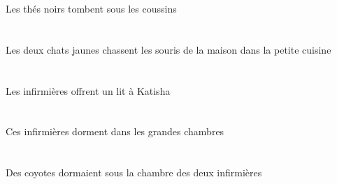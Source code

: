 \begin{exe}
Les thés noirs tombent sous les coussins
\ex\glll
\DEFDuErg{}   \jauneDDu{}   \chatDDuErg{}    \DEFSgObl{}   \petitDSg{}   \cuisineDSgObl{}   \DANS{}   \DEFPlAbs{}    \DEFSgObl{}   \maisonDSgObl{}   \DE{}   \sourisBPlAbs{}  \chasserVtPrsBPl{}\\
\DEFDuErgP{}   \jauneDDuP{}   \chatDDuErgP{}    \DEFSgOblP{}   \petitDSgP{}   \cuisineDSgOblP{}   \DANSP{}   \DEFPlAbsP{}    \DEFSgOblP{}   \maisonDSgOblP{}   \DEP{}   \sourisBPlAbsP{}  \chasserVtPrsBPlP{}\\
\DEFDuErgG{}   \jauneDDuG{}   \chatDDuErgG{}    \DEFSgOblG{}   \petitDSgG{}   \cuisineDSgOblG{}   \DANSG{}   \DEFPlAbsG{}    \DEFSgOblG{}   \maisonDSgOblG{}   \DEG{}   \sourisBPlAbsG{}  \chasserVtPrsBPlG{}\\
Les deux chats jaunes chassent les souris de la maison dans la petite cuisine
\ex\glll
\DEFPlErg{}   \infirmiereAPlErg{}    \INDSgDat{}   \KatishaASgDat{}   \INDSgAbs{}   \litDSgAbs{}  \offrirVdPrsDSg{}\\
\DEFPlErgP{}   \infirmiereAPlErgP{}    \INDSgDatP{}   \KatishaASgDatP{}   \INDSgAbsP{}   \litDSgAbsP{}  \offrirVdPrsDSgP{}\\
\DEFPlErgG{}   \infirmiereAPlErgG{}    \INDSgDatG{}   \KatishaASgDatG{}   \INDSgAbsG{}   \litDSgAbsG{}  \offrirVdPrsDSgG{}\\
Les infirmières offrent un lit à Katisha
\ex\glll
\DEMPlAbs{}   \infirmiereAPlAbs{}    \DEFPlObl{}   \grandBPl{}   \chambreBPlObl{}   \DANS{}  \dormirViPrsAPl{}\\
\DEMPlAbsP{}   \infirmiereAPlAbsP{}    \DEFPlOblP{}   \grandBPlP{}   \chambreBPlOblP{}   \DANSP{}  \dormirViPrsAPlP{}\\
\DEMPlAbsG{}   \infirmiereAPlAbsG{}    \DEFPlOblG{}   \grandBPlG{}   \chambreBPlOblG{}   \DANSG{}  \dormirViPrsAPlG{}\\
Ces infirmières dorment dans les grandes chambres
\ex\glll
\DEFSgObl{}    \DEFDuObl{}   \infirmiereADuObl{}   \DE{}   \chambreBSgObl{}   \SOUS{}   \INDPlAbs{}   \coyoteCPlAbs{}  \dormirViPstCPl{}\\
\DEFSgOblP{}    \DEFDuOblP{}   \infirmiereADuOblP{}   \DEP{}   \chambreBSgOblP{}   \SOUSP{}   \INDPlAbsP{}   \coyoteCPlAbsP{}  \dormirViPstCPlP{}\\
\DEFSgOblG{}    \DEFDuOblG{}   \infirmiereADuOblG{}   \DEG{}   \chambreBSgOblG{}   \SOUSG{}   \INDPlAbsG{}   \coyoteCPlAbsG{}  \dormirViPstCPlG{}\\
Des coyotes dormaient sous la chambre des deux infirmières
\ex\glll
\INDSgErg{}   \KatishaASgErg{}    \DEMDuDat{}   \filleCDuDat{}   \DEMPlAbs{}   \troisDPl{}   \chatDPlAbs{}  \donnerVdPrsDPl{}\\

\end{exe}
